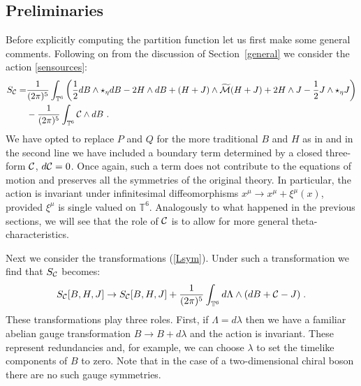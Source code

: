 \documentclass[11pt]{article}
\numberwithin{equation}{section}
\begin{document}
\subsection{Preliminaries}

Before explicitly computing the partition function let us first make some general comments. Following on from the discussion of Section~\ref{general} we consider the action \eqref{sensources}:
\begin{align}
   S_{\cal C}   = &\frac{1}{(2\pi)^{5}}	\int_{\mathbb{T}^{6}} \left(\frac12 d B\wedge\star_\eta d B -2H\wedge d B +   (H+J)\wedge {  \widetilde{\cal M}}(H+J) + 2H\wedge J- \frac12 J\wedge \star_\eta J \right)\nonumber\\
   & -\frac{1}{(2\pi)^{5}}	\int_{\mathbb{T}^{6}} {\cal C}\wedge dB\ .
\end{align}
We have opted to replace $P$ and $Q$ for the more traditional $B$ and $H$ as in \cite{Lambert:2019diy,Andriolo:2020ykk} and in the second line we have included a boundary term determined by a closed three-form ${\cal C}$, $d{\cal C}=0$. Once again, such a term does not contribute to the equations of motion and preserves all the symmetries of the original theory. In particular, the action is invariant under infinitesimal diffeomorphisms $x^\mu \to x^\mu +\xi^\mu (x)$, provided $\xi^\mu$ is single valued on $\mathbb{T}^{6}$. Analogously to what happened in the previous sections, we will see that the role of ${\cal C}$ is to allow for more general theta-characteristics. 

Next we consider the transformations (\ref{Lsym}).
Under such a transformation we find that $S_{\cal C}$ becomes:
\begin{align}
	S_{\cal C}[B,H, J] \to  S_{\cal C}[B,H,  J] +\frac{1}{(2\pi )^5}\int_{\mathbb T^6} d\Lambda\wedge (dB+{\cal C}-  J)\;. 
\end{align}
These transformations play three roles. First, if $\Lambda=d\lambda$ then we have a familiar abelian gauge transformation $B\to B+ d\lambda$ and the action is invariant. These represent redundancies and, for example,  we can choose $\lambda$ to set  the timelike components of $B$ to zero. Note that in the case of a two-dimensional chiral boson there are no such gauge symmetries. 
\end{document}
